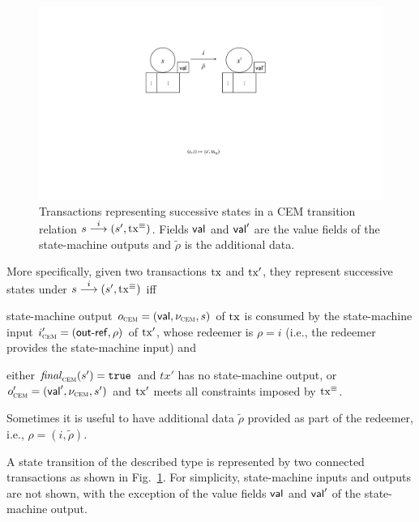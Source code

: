 \begin{figure}[t]
  \centering
  \includegraphics[scale=.2,width=\textwidth/2]{figures/state-transition_cropped.pdf}
  \caption{Transactions representing successive states in a CEM
    transition relation \({s}\overset{i}\longrightarrow(s', \mathrm{tx}^\equiv)\).  Fields
    $\mathsf{val}$ and $\mathsf{val}'$ are the value fields of the state-machine
    outputs and $\tilde \rho$ is the additional data.}
  \label{fig:state-transition}
\end{figure}

More specifically, given two transactions $\mathrm{tx}$ and $\mathrm{tx}'$, they represent successive states under \({s}\overset{i}\longrightarrow(s', \mathrm{tx}^\equiv)\) iff 

\begin{mitemize}
  \item state-machine output $o_{\textsc{cem}} = (\mathsf{val}, \nu_{\textsc{cem}}, s)$ of $\mathrm{tx}$
  is consumed by the state-machine input $i_{\textsc{cem}}' = (\mathsf{out\textsf{-}{}ref}, \rho)$
  of $\mathrm{tx}'$, whose redeemer is \(\rho = i\) (i.e., the redeemer
  provides the state-machine input) and
  \item either $\mathit{final}_{\textsc{cem}}(s') = \mathtt{true}$ and $tx'$ has no state-machine
  output, or $o_{\textsc{cem}}' = (\mathsf{val}', \nu_{\textsc{cem}}, s')$ and $\mathrm{tx}'$ meets all
  constraints imposed by $\mathrm{tx}^\equiv$.
\end{mitemize}
Sometimes it is useful to have additional data $\tilde \rho$ provided
as part of the redeemer, i.e., $\rho = (i,\tilde \rho)$.

A state transition of the described type is represented by two connected
transactions as shown in Fig.~\ref{fig:state-transition}.  For
simplicity, state-machine inputs and outputs are not shown, with the
exception of the value fields $\mathsf{val}$ and $\mathsf{val}'$ of the state-machine output.


